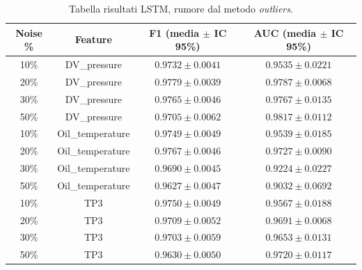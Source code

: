 \documentclass[../main.tex]{subfiles}
\begin{document}
\begin{table}[H]
\centering\small
{}
\begin{tabular}{cccc}
\toprule
\textbf{Noise \%} & \textbf{Feature} & \textbf{F1 (media $\pm$ IC 95\%)} & \textbf{AUC (media $\pm$ IC 95\%)} \\
\midrule
10\% & DV\_pressure     & $0.9732 \pm 0.0041$ & $0.9535 \pm 0.0221$ \\
20\% & DV\_pressure     & $0.9779 \pm 0.0039$ & $0.9787 \pm 0.0068$ \\
30\% & DV\_pressure     & $0.9765 \pm 0.0046$ & $0.9767 \pm 0.0135$ \\
50\% & DV\_pressure     & $0.9705 \pm 0.0062$ & $0.9817 \pm 0.0112$ \\
\midrule
10\% & Oil\_temperature & $0.9749 \pm 0.0049$ & $0.9539 \pm 0.0185$ \\
20\% & Oil\_temperature & $0.9767 \pm 0.0046$ & $0.9727 \pm 0.0090$ \\
30\% & Oil\_temperature & $0.9690 \pm 0.0045$ & $0.9224 \pm 0.0227$ \\
50\% & Oil\_temperature & $0.9627 \pm 0.0047$ & $0.9032 \pm 0.0692$ \\
\midrule
10\% & TP3             & $0.9750 \pm 0.0049$ & $0.9567 \pm 0.0188$ \\
20\% & TP3             & $0.9709 \pm 0.0052$ & $0.9691 \pm 0.0068$ \\
30\% & TP3             & $0.9703 \pm 0.0059$ & $0.9653 \pm 0.0131$ \\
50\% & TP3             & $0.9630 \pm 0.0050$ & $0.9720 \pm 0.0117$ \\
\bottomrule
\end{tabular}
\caption{Tabella risultati LSTM, rumore dal metodo \textit{outliers}.}
\label{tab:lstm_outliers}
\end{table}

\newpage
\end{document}
